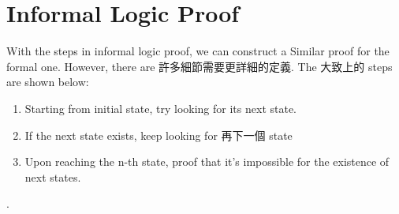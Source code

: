 \section{Informal Logic Proof}

With the steps in informal logic proof, we can construct a Similar proof for the formal one.  However, there are 許多細節需要更詳細的定義.
The 大致上的 steps are shown below:
\begin{enumerate}[1.]
\item Starting from initial state, try looking for its next state. 
\item If the next state exists, keep looking for 再下一個 state
\item Upon reaching the n-th state, proof that it's impossible for the existence of next states.
\end{enumerate}.